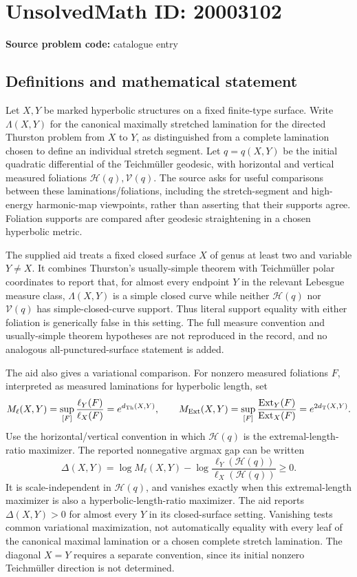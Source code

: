 \documentclass[11pt]{article}
\begin{document}
\section*{UnsolvedMath ID: 20003102}
\textbf{Source problem code:} catalogue entry
\subsection{Definitions and mathematical statement}
Let \(X,Y\) be marked hyperbolic structures on a fixed finite-type surface. Write \(\Lambda(X,Y)\) for the canonical maximally stretched lamination for the directed Thurston problem from \(X\) to \(Y\), as distinguished from a complete lamination chosen to define an individual stretch segment. Let \(q=q(X,Y)\) be the initial quadratic differential of the Teichm\"uller geodesic, with horizontal and vertical measured foliations \(\mathcal H(q),\mathcal V(q)\). The source asks for useful comparisons between these laminations/foliations, including the stretch-segment and high-energy harmonic-map viewpoints, rather than asserting that their supports agree. Foliation supports are compared after geodesic straightening in a chosen hyperbolic metric.

The supplied aid treats a fixed closed surface \(X\) of genus at least two and variable \(Y\ne X\). It combines Thurston's usually-simple theorem with Teichm\"uller polar coordinates to report that, for almost every endpoint \(Y\) in the relevant Lebesgue measure class, \(\Lambda(X,Y)\) is a simple closed curve while neither \(\mathcal H(q)\) nor \(\mathcal V(q)\) has simple-closed-curve support. Thus literal support equality with either foliation is generically false in this setting. The full measure convention and usually-simple theorem hypotheses are not reproduced in the record, and no analogous all-punctured-surface statement is added.

The aid also gives a variational comparison. For nonzero measured foliations \(F\), interpreted as measured laminations for hyperbolic length, set
\[
M_{\ell}(X,Y)=\sup_{[F]}\frac{\ell_Y(F)}{\ell_X(F)}=e^{d_{\rm Th}(X,Y)},\qquad
M_{\rm Ext}(X,Y)=\sup_{[F]}\frac{\operatorname{Ext}_Y(F)}{\operatorname{Ext}_X(F)}=e^{2d_{\rm T}(X,Y)}.
\]
Use the horizontal/vertical convention in which \(\mathcal H(q)\) is the extremal-length-ratio maximizer. The reported nonnegative argmax gap can be written
\[
\Delta(X,Y)=\log M_\ell(X,Y)
-\log\frac{\ell_Y(\mathcal H(q))}{\ell_X(\mathcal H(q))}\ge0.
\]
It is scale-independent in \(\mathcal H(q)\), and vanishes exactly when this extremal-length maximizer is also a hyperbolic-length-ratio maximizer. The aid reports \(\Delta(X,Y)>0\) for almost every \(Y\) in its closed-surface setting. Vanishing tests common variational maximization, not automatically equality with every leaf of the canonical maximal lamination or a chosen complete stretch lamination. The diagonal \(X=Y\) requires a separate convention, since its initial nonzero Teichm\"uller direction is not determined.
\end{document}
